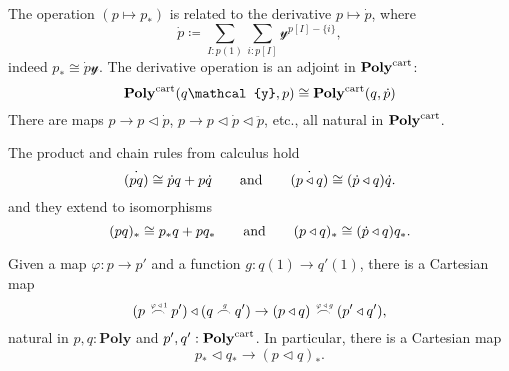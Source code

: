 \documentclass[11pt, one side, article]{memoir}
\theoremstyle{definition}
\theoremstyle{plain}
\newcommand{\Cat}[1]{\mathbf{#1}}%
\newcommand{\tn}[1]{\textnormal{#1}}
\newcommand{\yon}{{\mathcal{y}}}
\newcommand{\poly}{\Cat{Poly}}
\newcommand{\polycart}{\poly^{\tn{cart}}}
\newcommand{\0}{\textsf{0}}
\newcommand{\1}{\tn{\textsf{1}}}
\newcommand{\tri}{\mathbin{\triangleleft}}
\newcommand{\indexcoclscale}[1]{\scalebox{.7}{#1}}
\newcommand{\cocl}[1]{
	\scriptsize\overset{\,\indexcoclscale{$#1$}}{\frown}\normalsize
}
\newcommand{\hh}[2][]{#1 \tn{#2} #1}
\newcommand{\qqand}{\hh[\qquad]{and}}
\begin{document}
The operation $(p\mapsto p_*)$ is related to the derivative $p\mapsto\dot{p}$, where
\begin{equation}
\dot{p}\coloneqq\sum_{I:p(1)}\sum_{i:p[I]}\yon^{p[I]-\{i\}},
\end{equation}
indeed $p_*\cong\dot{p}\yon$. The derivative operation is an adjoint in $\polycart$:
\begin{equation}
  \polycart(q\yon,p)\cong
  \polycart(q,\dot{p})
\end{equation}
There are maps $p\to p\tri\dot{p}$, $p\to p\tri\dot{p}\tri\ddot{p}$, etc., all natural in $\polycart$. 

The product and chain rules from calculus hold
\begin{equation}\label{eqn.calculus}
	\dot{(pq)}\cong \dot{p}q+p\dot{q}
	\qqand
	\dot{(p\tri q)}\cong(\dot{p}\tri q)\dot{q}.
\end{equation}
and they extend to isomorphisms 
\begin{equation}\label{eqn.calculus}
	(pq)_*\cong p_*q+pq_*
	\qqand
	(p\tri q)_*\cong(\dot{p}\tri q)q_*.
\end{equation}

Given a map $\varphi\colon p\to p'$ and a function $g\colon q(1)\to q'(1)$, there is a Cartesian map
\begin{equation}
	(p\cocl{\varphi\tri1}p')\tri(q\cocl{g}q')\to
	(p\tri q)\cocl{\varphi\tri g}(p'\tri q'),
\end{equation}
natural in $p,q:\poly$ and $p',q':\polycart$. In particular, there is a Cartesian map
\begin{equation}
	p_*\tri q_*\to(p\tri q)_*.
\end{equation}
\end{document}
